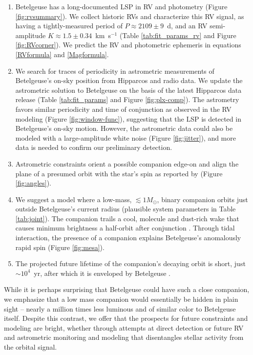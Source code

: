 \documentclass[twocolumn]{aastex631}
\begin{document}
\begin{enumerate}
    \item Betelgeuse has a long-documented LSP in RV and photometry (Figure \ref{fig:rvsummary}). We collect historic RVs and characterize this RV signal, as having a tightly-measured period of $P\approx 2109 \pm 9$~d, and an RV semi-amplitude $K\approx 1.5\pm 0.34$~km~s$^{-1}$ (Table \ref{tab:fit_params_rv} and Figure \ref{fig:RVcorner}). We predict the RV and photometric ephemeris in equations \eqref{RVformula} and \eqref{Magformula}. 
    
    \item We search for traces of periodicity in astrometric measurements of Betelgeuse's on-sky position from Hipparcos and radio data. We update the astrometric solution to Betelgeuse on the basis of the latest Hipparcos data release (Table \ref{tab:fit_params} and Figure \ref{fig:plx-comp}). The astrometry favors similar periodicity and time of conjunction as observed in the RV modeling (Figure \ref{fig:window-func}), suggesting that the LSP is detected in Betelgeuse's on-sky motion. However, the astrometric data could also be modeled with a large-amplitude white noise (Figure \ref{fig:jitter}), and more data is needed to confirm our preliminary detection. 
    
    \item Astrometric constraints orient a possible companion edge-on and align the plane of a presumed orbit with the star's spin as reported by \citet{2018A&A...609A..67K} (Figure \ref{fig:angles}). 
    
    \item We suggest a model where a low-mass, $\lesssim 1 M_\odot$, binary companion orbits just outside Betelgeuse's current radius (plausible system parameters in Table \ref{tab:joint}). The companion trails a cool, molecule and dust-rich wake that causes minimum brightness a half-orbit after conjunction \citep[see also][]{2024arXiv240809089G}. Through tidal interaction, the presence of a companion explains Betelgeuse's anomalously rapid spin (Figure \ref{fig:mesa}).
    \item The projected future lifetime of the companion's decaying orbit is short, just $\sim 10^4$~yr, after which it is enveloped by Betelgeuse \citep[a process recently simulated by][]{2024ApJ...962..168S}. 
\end{enumerate}
While it is perhaps surprising that Betelgeuse could have such a close companion, we emphasize that a low mass companion would essentially be hidden in plain sight -- nearly a million times less luminous and of similar color to Betelgeuse itself. Despite this contrast, we offer that the prospects for future constraints and modeling are bright, whether through attempts at direct detection or future RV and astrometric monitoring and modeling that disentangles stellar activity from the orbital signal. 
\end{document}

